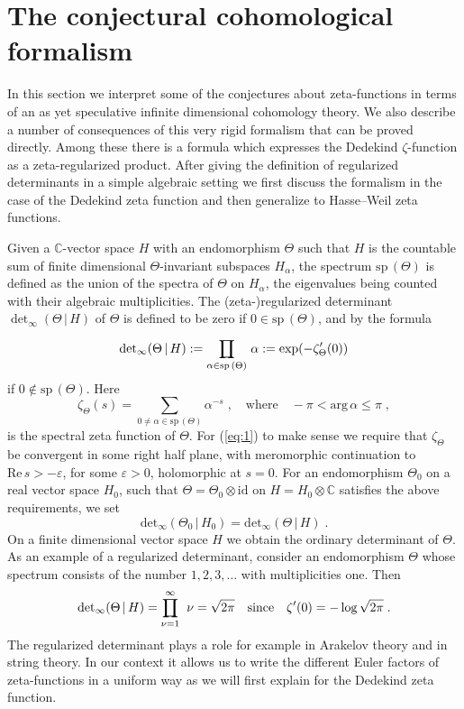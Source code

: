 \documentclass[11pt,leqno]{article}
\newcommand{\C}{{\mathbb{C}}}
\newcommand{\ddet}{\mathrm{det}}
\newcommand{\id}{\mathrm{id}}
\newcommand{\RRe}{\mathrm{Re}\,}
\newcommand{\ssp}{\mathrm{sp}\,}
\newcommand{\tei}{\, | \,}
\newcommand{\Rpp}[2]{\prod_{#1}^{#2} \hspace{-4mm} {\rule[-4pt]{2.5mm}{0.2mm}} \hspace{3mm}}
\newcommand{\RRp}[2]{\prod_{#1}^{#2} \hspace{-7mm} {\rule[-4pt]{2.5mm}{0.2mm}} \hspace{5mm}}
\begin{document}
\section{The conjectural cohomological formalism}

In this section we interpret some of the conjectures about zeta-functions in terms of an as yet speculative infinite dimensional cohomology theory. We also describe a number of consequences of this very rigid formalism that can be proved directly. Among these there is a formula which expresses the Dedekind $\zeta$-function as a zeta-regularized product. After giving the definition of regularized determinants in a simple algebraic setting we first discuss the formalism in the case of the Dedekind zeta function and then generalize to Hasse--Weil zeta functions.

Given a $\C$-vector space $H$ with an endomorphism $\Theta$ such that $H$ is the countable sum of finite dimensional $\Theta$-invariant subspaces $H_{\alpha}$, the spectrum $\ssp (\Theta)$ is defined as the union of the spectra of $\Theta$ on $H_{\alpha}$, the eigenvalues being counted with their algebraic multiplicities. The (zeta-)regularized determinant $\det_{\infty} (\Theta \tei H)$ of $\Theta$ is defined to be zero if $0 \in \ssp (\Theta)$, and by the formula
\begin{equation}
  \label{eq:1}
  \ddet_{\infty} (\Theta \tei H) := \RRp{\alpha \in \ssp (\Theta)}{} \alpha := \exp (-\zeta'_{\Theta} (0))
\end{equation}
if $0 \notin \ssp (\Theta)$. Here
\[
\zeta_{\Theta} (s) = \sum_{0 \neq \alpha \in \ssp (\Theta)} \alpha^{-s} \; , \quad \mbox{where} \quad - \pi < \mathrm{arg}\, \alpha \le \pi \; ,
\]
is the spectral zeta function of $\Theta$. For (\ref{eq:1}) to make sense we require that $\zeta_{\Theta}$ be convergent in some right half plane, with meromorphic continuation to $\RRe s > - \varepsilon$, for some $\varepsilon > 0$, holomorphic at $s = 0$. For an endomorphism $\Theta_0$ on a real vector space $H_0$, such that $\Theta = \Theta_0 \otimes \id$ on $H = H_0 \otimes \C$ satisfies the above requirements, we set
\[
\ddet_{\infty} (\Theta_0 \tei H_0) = \ddet_{\infty} (\Theta \tei H) \; .
\]
On a finite dimensional vector space $H$ we obtain the ordinary determinant of $\Theta$. As an example of a regularized determinant, consider an endomorphism $\Theta$ whose spectrum consists of the number $1 , 2 , 3 , \ldots$ with multiplicities one. Then
\[
\ddet_{\infty} (\Theta \tei H) = \Rpp{\nu = 1}{\infty} \nu = \sqrt{2\pi} \quad \mbox{since} \quad \zeta' (0) = - \log \sqrt{2 \pi} \; .
\]
The regularized determinant plays a role for example in Arakelov theory and in string theory. In our context it allows us to write the different Euler factors  of zeta-functions in a uniform way as we will first explain for the Dedekind zeta function.\\
\end{document}

